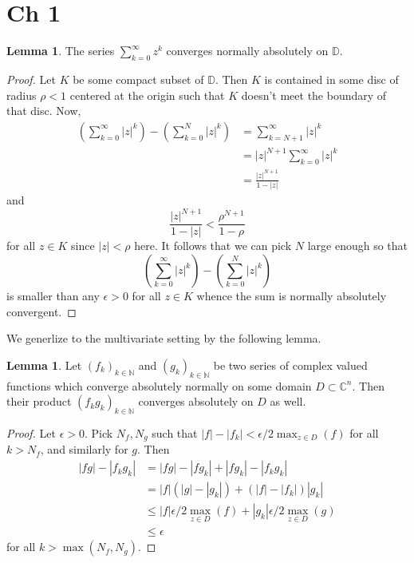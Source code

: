 \documentclass{article}
\theoremstyle{definition}
\newtheorem{lemma}[theorem]{Lemma}
\newcommand{\C}{\mathbb{C}}
\newcommand{\N}{\mathbb{N}}
\newcommand{\D}{\mathbb{D}}
\begin{document}
\section*{Ch 1}

\begin{lemma}
	The series $\sum_{k = 0}^{\infty} z^{k}$ converges 
	normally absolutely on $\D$.
\end{lemma}
\begin{proof}
	Let $K$ be some compact subset of $\D$. Then $K$ is contained in some disc
	of radius $\rho < 1$ centered at the origin such that $K$ doesn't meet the
	boundary of that disc. Now,
	\begin{align*}
		\left(\sum_{k = 0}^{\infty} |z|^{k}\right)
		-
		\left(\sum_{k = 0}^{N} |z|^{k}\right)
		&=
		\sum_{k = N + 1}^{\infty} |z|^{k} \\
		&=
		|z|^{N + 1}
		\sum_{k = 0}^{\infty} |z|^{k} \\
		&=
		\frac{|z|^{N + 1}}{1 - |z|}
	\end{align*}
	and 
	\[
		\frac{|z|^{N + 1}}{1 - |z|}
		<
		\frac{\rho^{N + 1}}{1 - \rho}
	\] 
	for all $z \in K$ since $|z| < \rho$ here. It follows that we can pick $N$
	large enough so that 
	\[
		\left(\sum_{k = 0}^{\infty} |z|^{k}\right)
		-
		\left(\sum_{k = 0}^{N} |z|^{k}\right)
	\] 
	is smaller than any $\epsilon > 0$ for all $z \in K$ whence the sum is
	normally absolutely convergent.
\end{proof}

We generlize to the multivariate setting by the following lemma.

\begin{lemma}
	Let $(f_k)_{k \in \N}$ and $(g_k)_{k \in \N}$ be two series of complex
	valued functions which converge absolutely normally on some domain $D
	\subset \C^{n}$. Then their product $(f_k g_k)_{k \in \N}$ converges
	absolutely on $D$ as well.
\end{lemma}
\begin{proof}
	Let $\epsilon > 0$. Pick $N_f, N_g$ such that $|f| - |f_k| < \epsilon/2\max_{z \in D}(f)$	
	for all $k > N_f$, and similarly for $g$. Then 
	\begin{align*}
		|fg| - |f_k g_k|
		&=
		|fg| - |f g_k| + |f g_k| - |f_kg_k| \\
		&=
		|f|(|g| - |g_k|) + (|f| - |f_k|)|g_k| \\
		&\leq
		|f|\epsilon/2\max_{z \in D}(f) + |g_k|\epsilon/2\max_{z \in D}(g) \\
		&\leq \epsilon
	\end{align*} 
	for all $k > \max(N_f, N_g)$.
\end{proof}
\end{document}
